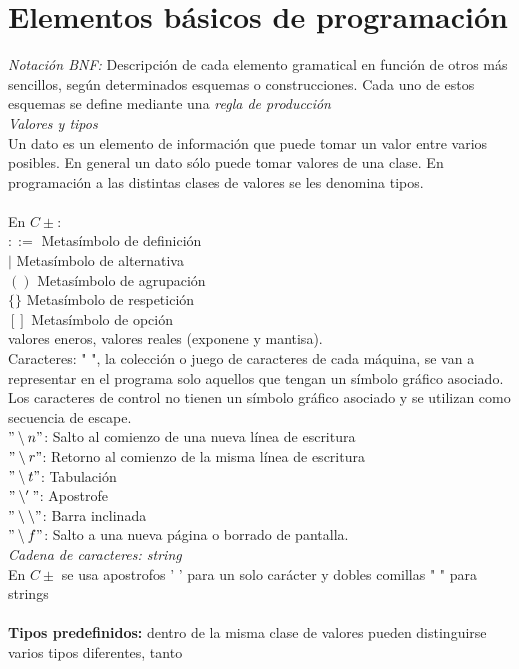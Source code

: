 \documentclass[11pt,a4paper]{article}
\begin{document}
	\section{Elementos básicos de programación}
	\textit{Notación BNF:} Descripción de cada elemento gramatical en función de otros más sencillos, según determinados esquemas o construcciones. Cada uno de estos esquemas se define mediante una \textit{regla de producción}\\
	\textit{Valores y tipos}\\
	Un dato es un elemento de información que puede tomar un
	valor entre varios posibles. En general un dato
	sólo puede tomar valores de una clase. En programación a las distintas clases de valores se les denomina tipos.
	\\ \\
	En $C\pm$:\\
	$::=$ Metasímbolo de definición\\
	$|$ Metasímbolo de alternativa\\
	$()$ Metasímbolo de agrupación\\
	$\{\}$ Metasímbolo de respetición\\
	$[]$ Metasímbolo de opción\\
	valores eneros, valores reales (exponene y mantisa).\\
	Caracteres: " ", la colección o juego de caracteres de cada máquina, se van a representar en el programa solo aquellos que tengan un símbolo gráfico asociado.\\
	Los caracteres de control no tienen un símbolo gráfico asociado y se utilizan como secuencia de escape.\\
	$"\setminus n"$: Salto al comienzo de una nueva línea de escritura\\
	$"\setminus r" $: Retorno al comienzo de la misma línea de escritura\\
	$"\setminus t"$: Tabulación\\
	$"\setminus '"$: Apostrofe\\
	$"\setminus \setminus"$: Barra inclinada\\
	$"\setminus f"$: Salto a una nueva página o borrado de pantalla.\\
	\textit{Cadena de caracteres: string}\\
	En $C\pm$ se usa apostrofos ' ' para un solo carácter y dobles comillas " " para strings \\
	\\
	\textbf{Tipos predefinidos:} dentro 
	de la misma clase de valores pueden distinguirse varios tipos diferentes, tanto 
\end{document}
